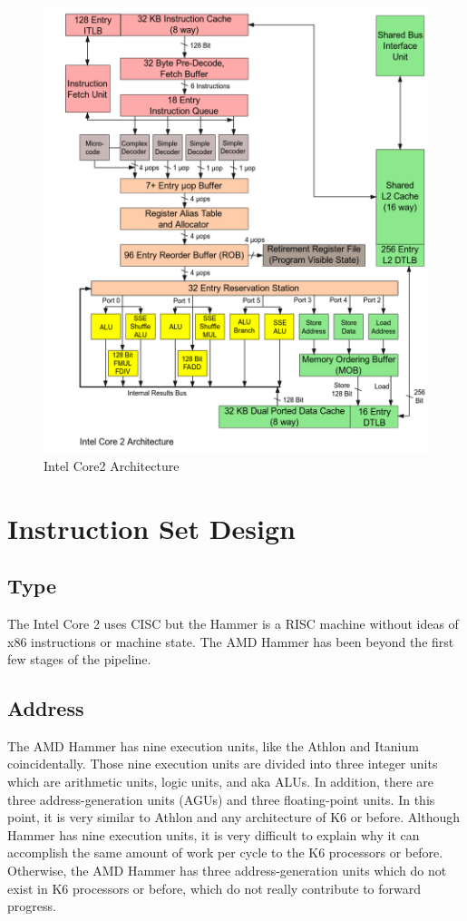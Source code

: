 \documentclass[letterpaper,10pt,compsoc,draftclsnofoot,onecolumn]{IEEEtran}
\begin{document}
\begin{figure}[!bhpt]
\begin{minipage}{0.5\textwidth}
\centering\includegraphics[scale=0.23]{figures/Intel_Core2}
\caption{Intel Core2 Architecture\cite{intel_core2}}
\label{fig:K8}
\end{minipage}
\end{figure}

\section{Instruction Set Design}
\subsection{Type}
The Intel Core 2 uses CISC but the Hammer is a RISC machine without ideas of x86 instructions or machine state. The AMD Hammer has been beyond the first few stages of the pipeline.

\subsection{Address}
The AMD Hammer has nine execution units, like the Athlon and Itanium coincidentally. Those nine execution units are divided into three integer units which are arithmetic units, logic units, and aka ALUs. In addition, there are three address-generation units (AGUs) and three floating-point units. In this point, it is very similar to Athlon and any architecture of K6 or before. Although Hammer has nine execution units, it is very difficult to explain why it can accomplish the same amount of work per cycle to the K6 processors or before. Otherwise, the AMD Hammer has three address-generation units which do not exist in K6 processors or before, which do not really contribute to forward progress.
\end{document}
